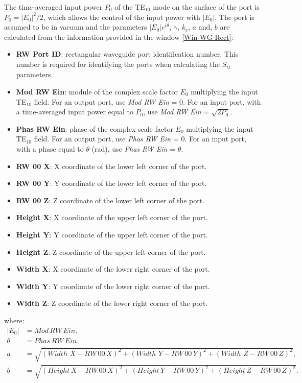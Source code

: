 The time-averaged input power $P_{0}$ of the TE$_{10}$ mode on the surface of the port is $P_{0} = |E_{0}|^2/2$, which allows the control of the input power with $|E_{0}|$. The port is assumed to be in vacuum and the parameters $|E_{0}|e^{i\theta}$, $\gamma$, $k_{c}$, $a$ and, $b$ are calculated from the information provided in the window \ref{Win-WG-Rect}:
\begin{itemize}\itemsep0em 
	\item \textbf{RW Port ID}: rectangular waveguide port identification number. This number is required for identifying the ports when calculating the $S_{ij}$ parameters. 
	\\
	\item \textbf{Mod RW Ein}: module of the complex scale factor $E_{0}$ multiplying the input TE$_{10}$ field. For an output port, use \textit{Mod RW Ein} = 0. For an input port, with a time-averaged input power equal to $P_{0}$,
	use \textit{Mod RW Ein} = $\sqrt{2P_{0}}$.
	\item \textbf{Phas RW Ein}: phase of the complex scale factor $E_{0}$ multiplying the input TE$_{10}$ field. For an output port, use \textit{Phas RW Ein} = 0. For an input port, with a phase equal to $\theta$ (rad), use \textit{Phas RW Ein} = $\theta$.
	\\
	\item \textbf{RW 00 X}: X coordinate of the lower left corner of the port.
	\item \textbf{RW 00 Y}: Y coordinate of the lower left corner of the port.
	\item \textbf{RW 00 Z}: Z coordinate of the lower left corner of the port.
	\\
	\item \textbf{Height X}: X coordinate of the upper left corner of the port.
	\item \textbf{Height Y}: Y coordinate of the upper left corner of the port.
	\item \textbf{Height Z}: Z coordinate of the upper left corner of the port.
	\\
	\item \textbf{Width X}: X coordinate of the lower right corner of the port.
	\item \textbf{Width Y}: Y coordinate of the lower right corner of the port.
	\item \textbf{Width Z}: Z coordinate of the lower right corner of the port.
\end{itemize}
where: 
\begin{equation}\label{RW-Parameters}
	\begin{aligned}\nonumber
	    |E_{0}| &= Mod\,RW\,Ein,\\
	    \theta\,\,\, &= Phas\,RW\,Ein,\\
	    a\,\,\, &= \sqrt{(Width\,\,X - RW\,00\,X)^2 + (Width\,\,Y - RW\,00\,Y)^2 + (Width\,\,Z - RW\,00\,Z)^2},\\
	    b\,\,\, &= \sqrt{(Height\,X - RW\,00\,X)^2 + (Height\,Y - RW\,00\,Y)^2 + (Height\,Z - RW\,00\,Z)^2}.\\
	\end{aligned}
\end{equation}
